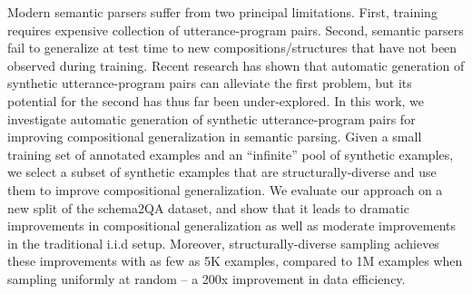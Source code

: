 Modern semantic parsers suffer from two principal limitations. First, training requires expensive collection of utterance-program pairs. Second, semantic parsers fail to generalize at test time to new compositions/structures that have not been observed during training. Recent research has shown that automatic generation of synthetic utterance-program pairs can alleviate the first problem, but its potential for the second has thus far been under-explored. In this work, we investigate automatic generation of synthetic utterance-program pairs for improving compositional generalization in semantic parsing. Given a small training set of annotated examples and an ``infinite'' pool of synthetic examples, we select a subset of synthetic examples that are structurally-diverse and use them to improve compositional generalization. We evaluate our approach on a new split of the schema2QA dataset, and show that it leads to dramatic improvements in compositional generalization as well as moderate improvements in the traditional i.i.d setup. Moreover, structurally-diverse sampling achieves these improvements with as few as 5K examples, compared to 1M examples when sampling uniformly at random -- a 200x improvement in data efficiency.
